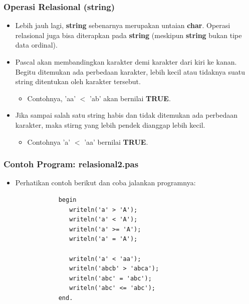 \documentclass{beamer}
\begin{document}
\begin{frame}
\frametitle{Operasi Relasional (string)}
\begin{itemize}
	\item Lebih jauh lagi, \textbf{string} sebenarnya merupakan untaian \textbf{char}. Operasi relasional juga bisa diterapkan pada \textbf{string} (meskipun \textbf{string} bukan tipe data ordinal).
	\item Pascal akan membandingkan karakter demi karakter dari kiri ke kanan. Begitu ditemukan ada perbedaan karakter, lebih kecil atau tidaknya suatu string ditentukan oleh karakter tersebut.
	\begin{itemize}
		\item Contohnya, 'aa' $<$ 'ab' akan bernilai \textbf{TRUE}.
	\end{itemize}
	\item Jika sampai salah satu string habis dan tidak ditemukan ada perbedaan karakter, maka stirng yang lebih pendek dianggap lebih kecil.
	\begin{itemize}
		\item Contohnya 'a' $<$ 'aa' bernilai \textbf{TRUE}. 
	\end{itemize}
\end{itemize}
\end{frame}

\begin{frame}[fragile]
\frametitle{Contoh Program: relasional2.pas}
\begin{itemize}
	\item Perhatikan contoh berikut dan coba jalankan programnya:
		\begin{lstlisting}
			begin
			   writeln('a' > 'A');
			   writeln('a' < 'A');
			   writeln('a' >= 'A');
			   writeln('a' = 'A');
			
			   writeln('a' < 'aa');
			   writeln('abcb' > 'abca');
			   writeln('abc' = 'abc');
			   writeln('abc' <= 'abc');
			end.
		\end{lstlisting}
\end{itemize}
\end{frame}
\end{document}
